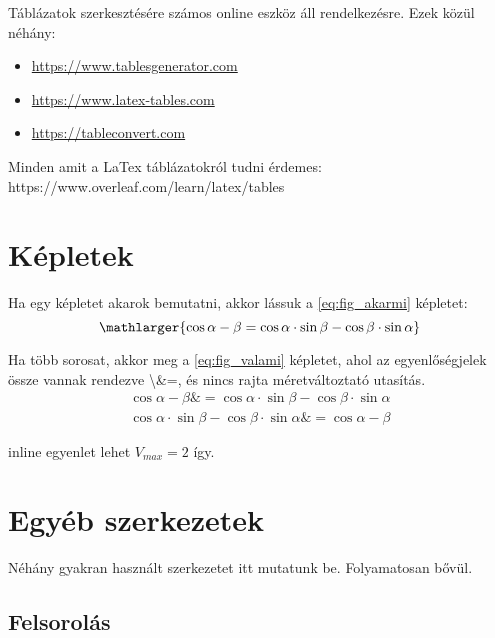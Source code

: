 \documentclass[12pt,a4paper]{article}
\begin{document}
	Táblázatok szerkesztésére számos online eszköz áll rendelkezésre. Ezek közül néhány:
	\begin{itemize}
		\item \href{https://www.tablesgenerator.com}{https://www.tablesgenerator.com}
		\item \href{https://www.latex-tables.com}{https://www.latex-tables.com}
		\item \href{https://tableconvert.com}{https://tableconvert.com}
	\end{itemize}


	Minden amit a LaTex táblázatokról tudni érdemes: https://www.overleaf.com/learn/latex/tables
	
	\section{Képletek}
	Ha egy képletet akarok bemutatni, akkor lássuk a \ref{eq:fig_akarmi} képletet:\\
    \begin{equation}
        \mathlarger{ %
        \cos{\alpha-\beta} = \cos{\alpha}\cdot\sin{\beta}-\cos{\beta}\cdot\sin{\alpha}}
        \label{eq:fig_akarmi}
    \end{equation}	
    
    Ha több sorosat, akkor meg a \ref{eq:fig_valami} képletet, ahol az egyenlőségjelek össze vannak rendezve \textbackslash \&=, és nincs rajta méretváltoztató utasítás.
    \begin{equation}
        \begin{aligned}
        \cos{\alpha-\beta} \&= \cos{\alpha}\cdot\sin{\beta}-\cos{\beta}\cdot\sin{\alpha}\\
         \cos{\alpha}\cdot\sin{\beta}-\cos{\beta}\cdot\sin{\alpha} \&= \cos{\alpha-\beta}
        \end{aligned}
        \label{eq:fig_valami}
    \end{equation}	
    
    inline egyenlet lehet \(V_{max}=2 \) így. 

	\section{Egyéb szerkezetek}
	Néhány gyakran használt szerkezetet itt mutatunk be. Folyamatosan bővül.
	
	\subsection{Felsorolás}
		
\end{document}
